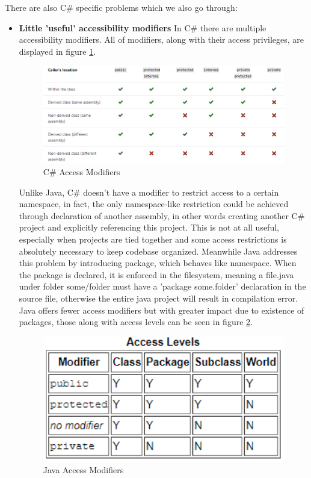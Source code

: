 \documentclass{article}
\begin{document}
There are also C\# specific problems which we also go through:
\begin{itemize}
    \item \textbf{Little 'useful' accessibility modifiers} \newline
          In C\# there are multiple accessibility modifiers. All of modifiers, along with their access privileges, are displayed in figure \ref*{fig:accessc}.
          \begin{figure}[H]
              \centering
              \includegraphics[width=1\textwidth]{access_csharp.PNG}
              \caption{C\# Access Modifiers}
              \label{fig:accessc}
          \end{figure}
          Unlike Java, C\# doesn't have a modifier to restrict access to a certain namespace, in fact, the only namespace-like restriction could be achieved through declaration of another assembly, in other words creating another C\# project and explicitly referencing this project. This is not at all useful, especially when projects are tied together and some access restrictions is absolutely necessary to keep codebase organized.
          Meanwhile Java addresses this problem by introducing package, which behaves like namespace. When the package is declared, it is enforced in the filesystem, meaning a file.java under folder some/folder must have a 'package some.folder' declaration in the source file, otherwise the entire java project will result in compilation error.
          Java offers fewer access modifiers but with greater impact due to existence of packages, those along with access levels can be seen in figure \ref*{fig:accessjav}.
          \begin{figure}[H]
              \centering
              \includegraphics[width=1\textwidth]{access_java.PNG}
              \caption{Java Access Modifiers}
              \label{fig:accessjav}
          \end{figure}


\end{itemize}
\end{document}
